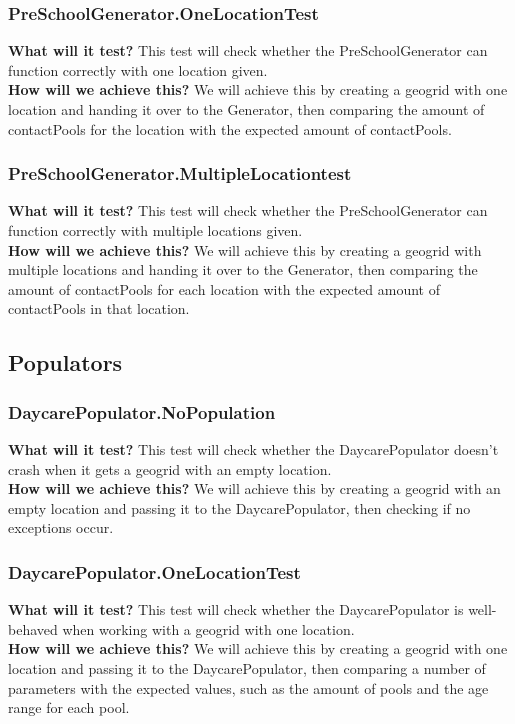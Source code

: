 \documentclass{article}
\begin{document}
\subsubsection{PreSchoolGenerator.OneLocationTest}
\textbf{What will it test?}
This test will check whether the PreSchoolGenerator can function correctly with one location given. \\
\newline
\textbf{How will we achieve this?}
We will achieve this by creating a geogrid with one location and handing it over to the Generator, then comparing the amount of contactPools for the location with the expected amount of contactPools.

\subsubsection{PreSchoolGenerator.MultipleLocationtest}
\textbf{What will it test?}
This test will check whether the PreSchoolGenerator can function correctly with multiple locations given. \\
\newline
\textbf{How will we achieve this?}
We will achieve this by creating a geogrid with multiple locations and handing it over to the Generator, then comparing the amount of contactPools for each location with the expected amount of contactPools in that location.

\subsection{Populators}
\subsubsection{DaycarePopulator.NoPopulation}
\textbf{What will it test?}
This test will check whether the DaycarePopulator doesn't crash when it gets  a geogrid with an empty location. \\
\newline
\textbf{How will we achieve this?}
We will achieve this by creating a geogrid with an empty location and passing it to the DaycarePopulator, then checking if no exceptions occur.

\subsubsection{DaycarePopulator.OneLocationTest}
\textbf{What will it test?}
This test will check whether the DaycarePopulator is well-behaved when working with a geogrid with one location. \\
\newline
\textbf{How will we achieve this?}
We will achieve this by creating a geogrid with one location and passing it to the DaycarePopulator, then comparing a number of parameters with the expected values, such as the amount of pools and the age range for each pool.
\end{document}
